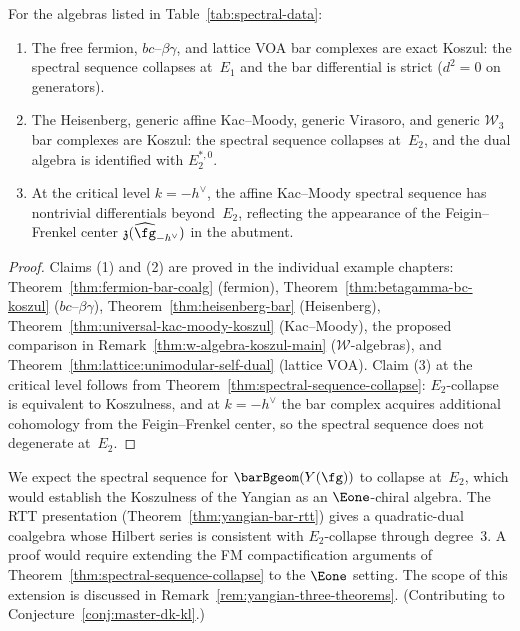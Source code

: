 \begin{proposition}
\label{prop:spectral-collapse-summary}
For the algebras listed in Table~\textup{\ref{tab:spectral-data}}:
\begin{enumerate}
\item The free fermion, $bc$--$\beta\gamma$, and lattice VOA
  bar complexes are exact Koszul: the spectral sequence collapses
  at~$E_1$ and the bar differential is strict ($d^2 = 0$ on generators).
\item The Heisenberg, generic affine Kac--Moody, generic Virasoro,
  and generic $\mathcal{W}_3$ bar complexes are Koszul: the spectral
  sequence collapses at~$E_2$, and the dual algebra is identified
  with $E_2^{*,0}$.
\item At the critical level $k = -h^\vee$, the affine Kac--Moody
  spectral sequence has nontrivial differentials beyond~$E_2$,
  reflecting the appearance of the Feigin--Frenkel center
  $\mathfrak{z}(\widehat{\fg}_{-h^\vee})$ in the abutment.
\end{enumerate}
\end{proposition}

\begin{proof}
Claims (1) and (2) are proved in the individual example chapters:
Theorem~\ref{thm:fermion-bar-coalg} (fermion),
Theorem~\ref{thm:betagamma-bc-koszul} ($bc$--$\beta\gamma$),
Theorem~\ref{thm:heisenberg-bar} (Heisenberg),
Theorem~\ref{thm:universal-kac-moody-koszul} (Kac--Moody),
the proposed comparison in Remark~\ref{thm:w-algebra-koszul-main} ($\mathcal{W}$-algebras),
and Theorem~\ref{thm:lattice:unimodular-self-dual} (lattice VOA).
Claim (3) at the critical level follows from
Theorem~\ref{thm:spectral-sequence-collapse}:
$E_2$-collapse is equivalent to Koszulness, and at $k = -h^\vee$
the bar complex acquires additional cohomology from the
Feigin--Frenkel center, so the spectral sequence does not degenerate
at~$E_2$.
\end{proof}

\begin{remark}\label{rem:yangian-collapse-conj}
\ClaimStatusConjectured
{}
We expect the spectral sequence for $\barBgeom(Y(\fg))$ to collapse
at~$E_2$, which would establish the Koszulness of the Yangian as
an $\Eone$-chiral algebra.
The RTT presentation (Theorem~\ref{thm:yangian-bar-rtt}) gives a
quadratic-dual coalgebra whose Hilbert series is consistent with
$E_2$-collapse through degree~$3$.
A proof would require extending the FM compactification arguments
of Theorem~\ref{thm:spectral-sequence-collapse} to the $\Eone$
setting.
The scope of this extension is discussed in
Remark~\ref{rem:yangian-three-theorems}.
(Contributing to Conjecture~\ref{conj:master-dk-kl}.)
\end{remark}

